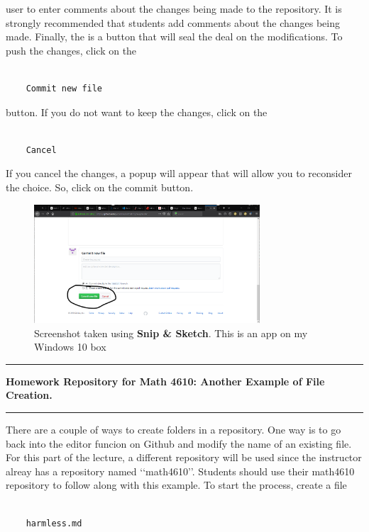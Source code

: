 \documentclass[10pt,fleqn]{article}
\begin{document}
user to enter comments about the changes being made to the repository. It is
strongly recommended that students add comments about the changes being made.
Finally, the is a button that will seal the deal on the modifications. To
push the changes, click on the
\begin{verbatim}

    Commit new file

\end{verbatim}
button. If you do not want to keep the changes, click on the
\begin{verbatim}

    Cancel

\end{verbatim}
If you cancel the changes, a popup will appear that will allow you to reconsider
the choice. So, click on the commit button.
\vfill
\begin{figure}[h]
\centering
\includegraphics[width=0.75\textwidth]{../images/github_07.png}
\caption{{Screenshot} taken using {\bf Snip \& Sketch}. This is an app on
         my Windows 10 box}
\end{figure}
\eject
\vskip0.1in\hrule\vskip0.1in
\noindent
{\bf Homework Repository for Math 4610: Another Example of File Creation.} 
\vskip0.1in\hrule\vskip0.1in
There are a couple of ways to create folders in a repository. One way is to go
back into the editor funcion on Github and modify the name of an existing file.
For this part of the lecture, a different repository will be used since the
instructor alreay has a repository named \lq\lq math4610\rq\rq. Students should
use their math4610 repository to follow along with this example. To start the
process, create a file
\begin{verbatim}

    harmless.md

\end{verbatim}
\end{document}
